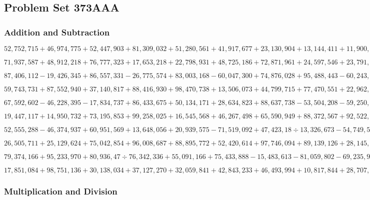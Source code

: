\hypertarget{problem-set-373aaa}{%
\subsection{Problem Set 373AAA}\label{problem-set-373aaa}}

\hypertarget{addition-and-subtraction}{%
\subsubsection{Addition and
Subtraction}\label{addition-and-subtraction}}

\(52,752,715+46,974,775+52,447,903+81,309,032+51,280,561+41,917,677+23,130,904+13,144,411+11,900,614+39,839,284\)

\(71,937,587+48,912,218+76,777,323+17,653,218+22,798,931+48,725,186+72,871,961+24,597,546+23,791,170+73,032,598\)

\(87,406,112-19,426,345+86,557,331-26,775,574+83,003,168-60,047,300+74,876,028+95,488,443-60,243,814+65,749,006\)

\(59,743,731+87,552,940+37,140,817+88,416,930+98,470,738+13,506,073+44,799,715+77,470,551+22,962,624+93,664,346\)

\(67,592,602-46,228,395-17,834,737+86,433,675+50,134,171+28,634,823+88,637,738-53,504,208-59,250,003+12,480,825\)

\(19,447,117+14,950,732+73,195,853+99,258,025+16,545,568+46,267,498+65,590,949+88,372,567+92,522,603+19,607,675\)

\(52,555,288-46,374,937+60,951,569+13,648,056+20,939,575-71,519,092+47,423,18÷13,326,673-54,749,597+16,623,647\)

\(26,505,711+25,129,624+75,042,854+96,008,687+88,895,772+52,420,614+97,746,094+89,139,126+28,145,820+40,635,349\)

\(79,374,166+95,233,970+80,936,47÷76,342,336+55,091,166+75,433,888-15,483,613-81,059,802-69,235,998+40,726,851\)

\(17,851,084+98,751,136+30,138,034+37,127,270+32,059,841+42,843,233+46,493,994+10,817,844+28,707,041+49,723,728\)

\hypertarget{multiplication-and-division}{%
\subsubsection{Multiplication and
Division}\label{multiplication-and-division}}

